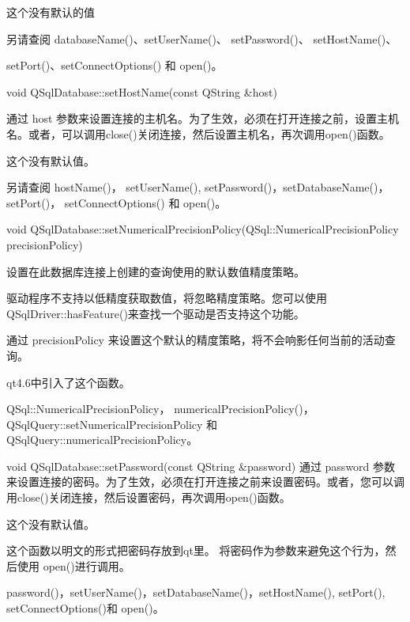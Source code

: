 这个没有默认的值

另请查阅 databaseName()、setUserName()、 setPassword()、 setHostName()、 

setPort()、setConnectOptions() 和 open()。


void QSqlDatabase::setHostName(const QString \&host)

通过 host 参数来设置连接的主机名。为了生效，必须在打开连接之前，设置主机名。或者，可以调用close()关闭连接，然后设置主机名，再次调用open()函数。

这个没有默认值。

另请查阅 hostName()， setUserName(), setPassword()，setDatabaseName()，setPort()， setConnectOptions() 和 open()。

void QSqlDatabase::setNumericalPrecisionPolicy(QSql::NumericalPrecisionPolicy precisionPolicy)


设置在此数据库连接上创建的查询使用的默认数值精度策略。

\begin{notice}
驱动程序不支持以低精度获取数值，将忽略精度策略。您可以使用 QSqlDriver::hasFeature()来查找一个驱动是否支持这个功能。
\end{notice}

\begin{notice}
通过 precisionPolicy 来设置这个默认的精度策略，将不会响影任何当前的活动查询。
\end{notice}

qt4.6中引入了这个函数。


\begin{notice}[另请查阅]
QSql::NumericalPrecisionPolicy，
numericalPrecisionPolicy()，QSqlQuery::setNumericalPrecisionPolicy 和 QSqlQuery::numericalPrecisionPolicy。
\end{notice}



void QSqlDatabase::setPassword(const QString \&password)
通过 password 参数来设置连接的密码。为了生效，必须在打开连接之前来设置密码。或者，您可以调用close()关闭连接，然后设置密码，再次调用open()函数。

这个没有默认值。

\begin{notice}[警告]
这个函数以明文的形式把密码存放到qt里。 将密码作为参数来避免这个行为，然后使用 open()进行调用。
\end{notice}

\begin{notice}[另请查阅]
password()，setUserName()，setDatabaseName()，setHostName(),
setPort(), setConnectOptions()和 open()。
\end{notice}


